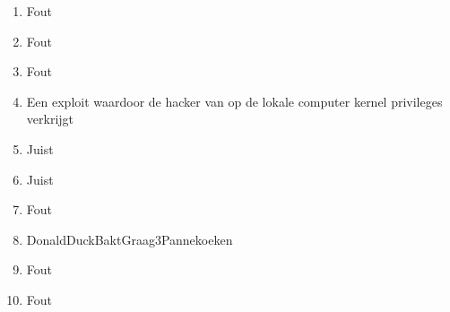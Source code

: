 \begin{enumerate}
  \item Fout
  \item Fout
  \item Fout
  \item Een exploit waardoor de hacker van op de lokale computer kernel privileges verkrijgt
  \item Juist
  \item Juist
  \item Fout
  \item DonaldDuckBaktGraag3Pannekoeken
  \item Fout
  \item Fout
\end{enumerate}